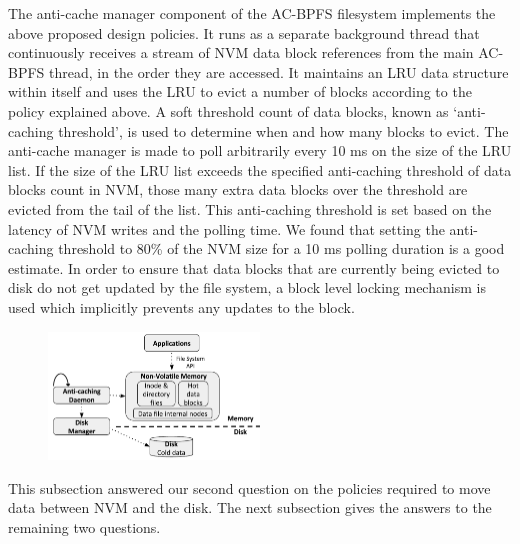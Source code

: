 The anti-cache manager component of the AC-BPFS filesystem implements the above proposed design policies. It runs as a separate background thread that continuously receives a stream of NVM data block references from the main AC-BPFS thread, in the order they are accessed. It maintains an LRU data structure within itself and uses the LRU to evict a number of blocks according to the policy explained above. A soft threshold count of data blocks, known as `anti-caching threshold', is used to determine when and how many blocks to evict. The anti-cache manager is made to poll arbitrarily every 10 ms on the size of the LRU list. If the size of the LRU list exceeds the specified anti-caching threshold of data blocks count in NVM, those many extra data blocks over the threshold are evicted from the tail of the list. This anti-caching threshold is set based on the latency of NVM writes and the polling time. We found that setting the anti-caching threshold to 80\% of the NVM size for a 10 ms polling duration is a good estimate. In order to ensure that data blocks that are currently being evicted to disk do not get updated by the file  system, a block level locking mechanism is used which implicitly prevents any updates to the block.

\begin{figure}
\centering
\vspace{-0.2in}
\includegraphics[width=0.5\textwidth]{figs/bpfs.pdf}
\vspace{-0.2in}
\end{figure}

This subsection answered our second question on the policies required to move data between NVM and the disk. The next subsection gives the answers to the remaining two questions.


